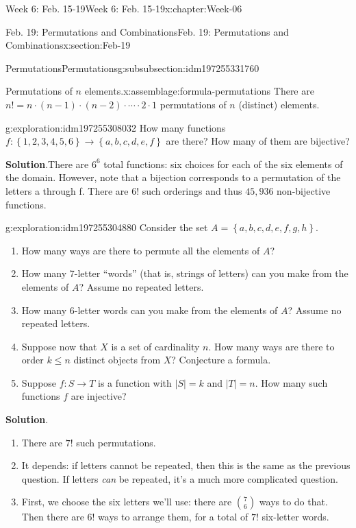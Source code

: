 \documentclass[oneside,10pt,]{book}
\newcommand{\blocktitlefont}{\relax}
\numberwithin{equation}{section}
\renewcommand{\le}{\leqslant}
\newcommand{\set}[1]{\left\{ {#1} \right\}}
\newcommand{\card}[1]{\left| #1 \right|}
\begin{document}
\begin{chapterptx}{Week 6: Feb. 15-19}{}{Week 6: Feb. 15-19}{}{}{x:chapter:Week-06}
\begin{sectionptx}{Feb. 19: Permutations and Combinations}{}{Feb. 19: Permutations and Combinations}{}{}{x:section:Feb-19}
\begin{subsubsectionptx}{Permutations}{}{Permutations}{}{}{g:subsubsection:idm197255331760}
\begin{assemblage}{Permutations of \(n\) elements.}{x:assemblage:formula-permutations}
There are \(n! = n\cdot (n-1)\cdot (n-2)\cdot \cdots \cdot 2\cdot 1\) permutations of \(n\) (distinct) elements.%
\end{assemblage}
\begin{exploration}{}{g:exploration:idm197255308032}%
How many functions \(f: \set{1,2,3,4,5,6} \to \set{a,b,c,d,e,f}\) are there? How many of them are bijective?%
\par\smallskip%
\noindent\textbf{\blocktitlefont Solution}.\hypertarget{g:solution:idm197255306896}{}\quad{}There are \(6^6\) total functions: six choices for each of the six elements of the domain. However, note that a bijection corresponds to a permutation of the letters a through f. There are \(6!\) such orderings and thus \(45,936\) non-bijective functions.%
\end{exploration}%
\begin{exploration}{}{g:exploration:idm197255304880}%
Consider the set \(A = \set{a,b,c,d,e,f,g,h}\).%
%
\begin{enumerate}
\item{}How many ways are there to permute all the elements of \(A\)?%
\item{}How many 7-letter ``words'' (that is, strings of letters) can you make from the elements of \(A\)? Assume no repeated letters.%
\item{}How many 6-letter words can you make from the elements of \(A\)? Assume no repeated letters.%
\item{}Suppose now that \(X\) is a set of cardinality \(n\). How many ways are there to order \(k\le n\) distinct objects from \(X\)? Conjecture a formula.%
\item{}Suppose \(f: S\to T\) is a function with \(\card{S} = k\) and \(\card{T} = n\). How many such functions \(f\) are injective?%
\end{enumerate}
\par\smallskip%
\noindent\textbf{\blocktitlefont Solution}.\hypertarget{g:solution:idm197255296976}{}\quad{}%
\begin{enumerate}
\item{}There are \(7!\) such permutations.%
\item{}It depends: if letters cannot be repeated, then this is the same as the previous question. If letters \emph{can} be repeated, it's a much more complicated question.%
\item{}First, we choose the six letters we'll use: there are \(\binom{7}{6}\) ways to do that. Then there are \(6!\) ways to arrange them, for a total of \(7!\) six-letter words.%

\end{enumerate}
\end{exploration}
\end{subsubsectionptx}
\end{sectionptx}
\end{chapterptx}
\end{document}
